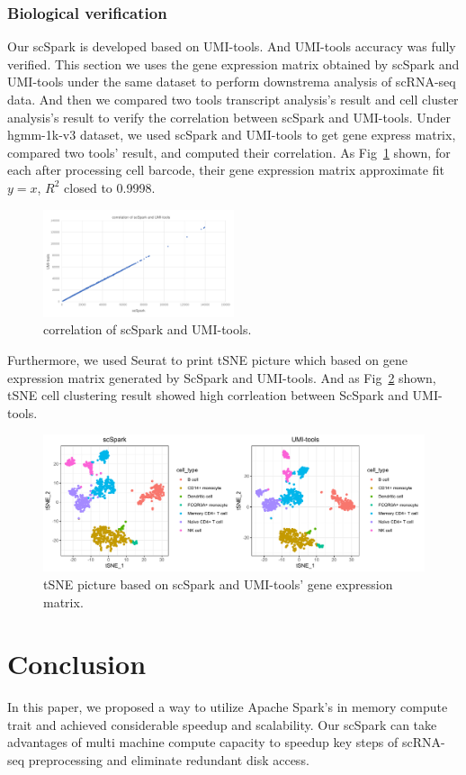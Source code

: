 \documentclass[conference]{IEEEtran}
\begin{document}
  \subsubsection{Biological verification}
  Our scSpark is developed based on UMI-tools. 
  And UMI-tools accuracy was fully verified. 
  This section we uses the gene expression matrix obtained by scSpark and UMI-tools under the same dataset to perform downstrema analysis of scRNA-seq data. 
  And then we compared two tools transcript analysis's result and cell cluster analysis's result to verify the correlation between scSpark and UMI-tools. 
  Under hgmm-1k-v3 dataset, we used scSpark and UMI-tools to get gene express matrix, compared two tools' result, and computed their correlation. 
  As Fig~\ref{fig9} shown, for each after processing cell barcode, their gene expression matrix approximate fit $y=x$, $R^{2}$ closed to 0.9998. 
  \begin{figure}
    \includegraphics[width=0.5\textwidth]{fig9.pdf}
    \caption{correlation of scSpark and UMI-tools.} \label{fig9}
  \end{figure}
  Furthermore, we used Seurat to print tSNE picture which based on gene expression matrix generated by ScSpark and UMI-tools. 
  And as Fig~\ref{fig10} shown, tSNE cell clustering result showed high corrleation between ScSpark and UMI-tools. 
  \begin{figure}
    \includegraphics[width=\textwidth]{fig10.pdf}
    \caption{tSNE picture based on scSpark and UMI-tools' gene expression matrix.} \label{fig10}
  \end{figure}
  \section{Conclusion}
  In this paper, we proposed a way to utilize Apache Spark's in memory compute trait and achieved considerable speedup and scalability. 
  Our scSpark can take advantages of multi machine compute capacity to speedup key steps of scRNA-seq preprocessing and eliminate redundant disk access. 
  
\end{document}
